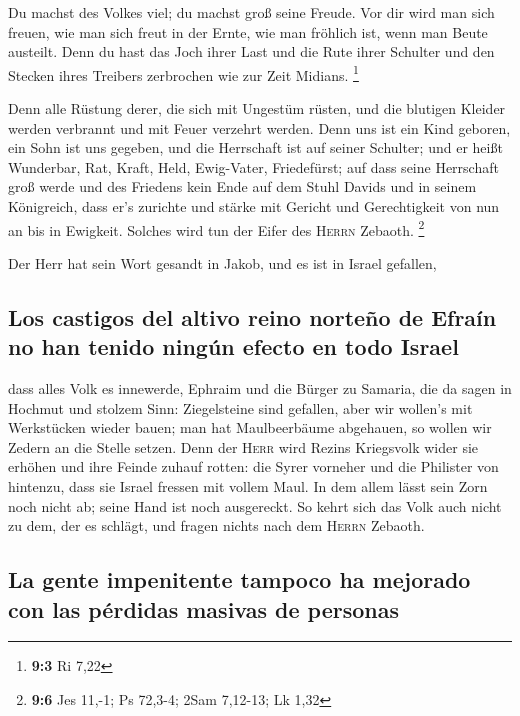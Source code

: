 Du machst des Volkes viel; du machst groß seine Freude.
Vor dir wird man sich freuen, wie man sich freut in der Ernte, wie man
fröhlich ist, wenn man Beute austeilt.  Denn du hast das
Joch ihrer Last und die Rute ihrer Schulter und den Stecken ihres
Treibers zerbrochen wie zur Zeit Midians. \footnote{\textbf{9:3} Ri 7,22}

 Denn alle Rüstung derer, die sich mit Ungestüm rüsten,
und die blutigen Kleider werden verbrannt und mit Feuer verzehrt werden.
 Denn uns ist ein Kind geboren, ein Sohn ist uns gegeben,
und die Herrschaft ist auf seiner Schulter; und er heißt Wunderbar, Rat,
Kraft, Held, Ewig-Vater, Friedefürst;  auf dass seine
Herrschaft groß werde und des Friedens kein Ende auf dem Stuhl Davids
und in seinem Königreich, dass er's zurichte und stärke mit Gericht und
Gerechtigkeit von nun an bis in Ewigkeit. Solches wird tun der Eifer des
\textsc{Herrn} Zebaoth. \footnote{\textbf{9:6} Jes 11,-1; Ps 72,3-4;
  2Sam 7,12-13; Lk 1,32}

 Der Herr hat sein Wort gesandt in Jakob, und es ist in
Israel gefallen,

\hypertarget{los-castigos-del-altivo-reino-norteuxf1o-de-efrauxedn-no-han-tenido-ninguxfan-efecto-en-todo-israel}{%
\subsection{Los castigos del altivo reino norteño de Efraín no han
tenido ningún efecto en todo
Israel}\label{los-castigos-del-altivo-reino-norteuxf1o-de-efrauxedn-no-han-tenido-ninguxfan-efecto-en-todo-israel}}

 dass alles Volk es innewerde, Ephraim und die Bürger zu
Samaria, die da sagen in Hochmut und stolzem Sinn: 
Ziegelsteine sind gefallen, aber wir wollen's mit Werkstücken wieder
bauen; man hat Maulbeerbäume abgehauen, so wollen wir Zedern an die
Stelle setzen.  Denn der \textsc{Herr} wird Rezins
Kriegsvolk wider sie erhöhen und ihre Feinde zuhauf rotten:
 die Syrer vorneher und die Philister von hintenzu, dass
sie Israel fressen mit vollem Maul. In dem allem lässt sein Zorn noch
nicht ab; seine Hand ist noch ausgereckt.  So kehrt sich
das Volk auch nicht zu dem, der es schlägt, und fragen nichts nach dem
\textsc{Herrn} Zebaoth.

\hypertarget{la-gente-impenitente-tampoco-ha-mejorado-con-las-puxe9rdidas-masivas-de-personas}{%
\subsection{La gente impenitente tampoco ha mejorado con las pérdidas
masivas de
personas}\label{la-gente-impenitente-tampoco-ha-mejorado-con-las-puxe9rdidas-masivas-de-personas}}

